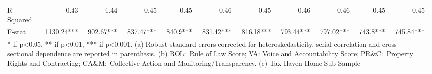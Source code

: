 \begin{sidewaystable}[ht]
{\begin{tabular}{lrrrrrrrrrr}
R-Squared & 0.43 & 0.44 & 0.45 & 0.45 & 0.46 & 0.45 & 0.46 & 0.46 & 0.45 & 0.45 \\
F-stat & 1130.24*** & 902.67*** & 837.47*** & 840.9*** & 831.42*** & 816.18*** & 793.44*** & 797.02*** & 743.8*** & 745.84*** \\
\bottomrule 
\multicolumn{11}{p{30cm}}{* if p<0.05, ** if p<0.01, *** if p<0.001. (a) Robust standard errors corrected for heteroskedasticity, serial correlation and cross-sectional dependence are reported in parenthesis. (b)  ROL$:$ Rule of Law Score; VA: Voice and Accountability Score; PR\&C$:$ Property
Rights and Contracting; CA\&M$:$ Collective Action and Monitoring/Transparency. (c) Tax-Haven Home Sub-Sample} 
\end{tabular}}
\end{sidewaystable}


